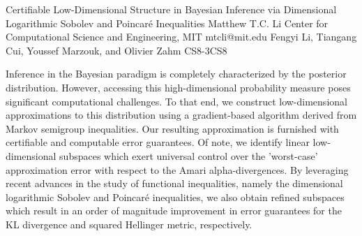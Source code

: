 \begin{talk}
  {Certifiable Low-Dimensional Structure in Bayesian Inference via Dimensional Logarithmic Sobolev and Poincar\'e Inequalities}%
  {Matthew T.C. Li}%
  {Center for Computational Science and Engineering, MIT}%
  {mtcli@mit.edu}%
  {Fengyi Li, Tiangang Cui, Youssef Marzouk, and Olivier Zahm}%
{}{}{CS8-3}{CS8}

			
 Inference in the Bayesian paradigm is completely characterized by the posterior distribution. However, accessing this high-dimensional probability measure poses significant computational challenges. To that end, we construct low-dimensional approximations to this distribution using a gradient-based algorithm derived from Markov semigroup inequalities. Our resulting approximation is furnished with certifiable and computable error guarantees. Of note, we identify linear low-dimensional subspaces which exert universal control over the 'worst-case' approximation error with respect to the Amari alpha-divergences. By leveraging recent advances in the study of functional inequalities, namely the dimensional logarithmic Sobolev and Poincar\'e inequalities, we also obtain refined subspaces which result in an order of magnitude improvement in error guarantees for the KL divergence and squared Hellinger metric, respectively.



\end{talk}

